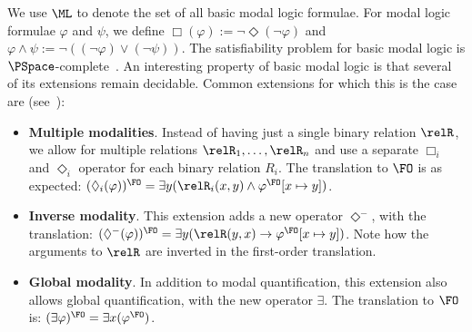 We use $\ML$ to denote the set of all basic modal logic formulae.
For modal logic formulae $\varphi$ and $\psi$, we define $\Box(\varphi) := \neg \Diamond(\neg \varphi)$ and $\varphi \land \psi := \neg ((\neg \varphi) \lor (\neg \psi))$.
The satisfiability problem for basic modal logic is $\PSpace$-complete~\cite{ladner1977}.
An interesting property of basic modal logic is that several of its extensions remain decidable.
Common extensions for which this is the case are (see~\cite[Sec.~5.1]{goranko2007}):
\begin{itemize}
  \item
        \textbf{Multiple modalities}.
        Instead of having just a single binary relation $\relR$, we allow for multiple relations $\relR_1, \ldots, \relR_{n}$ and use a separate $\Box_{i}$ and $\Diamond_{i}$ operator for each binary relation $R_{i}$.
        The translation to $\FO$ is as expected: $(\Diamond_{i}(\varphi))^{\FO} = \exists{y}(\relR_{i}(x,y) \land \varphi^{\FO}[x \mapsto y])$.
  \item
        \textbf{Inverse modality}.
        This extension adds a new operator $\Diamond^{-}$, with the translation: $(\Diamond^{-}(\varphi))^{\FO} = \exists{y}(\relR(y,x) \to \varphi^{\FO}[x \mapsto y])$.
        Note how the arguments to $\relR$ are inverted in the first-order translation.
  \item
        \textbf{Global modality}.
        In addition to modal quantification, this extension also allows global quantification, with the new operator $\exists$.
        The translation to $\FO$ is: $(\exists \varphi)^{\FO} = \exists{x}(\varphi^{\FO})$.
\end{itemize}

